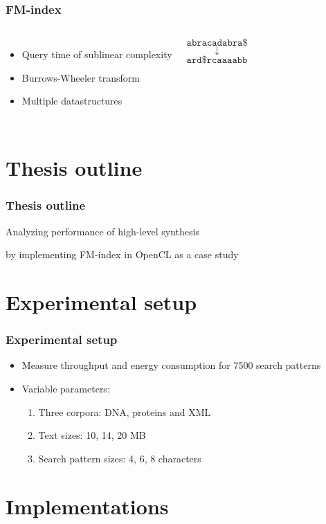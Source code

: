 \documentclass[aspectratio=1610]{uva-inf-presentation}
\begin{document}
\begin{frame}
  \frametitle{FM-index}
  \begin{columns}[c]
    \begin{itemize}
      \item Query time of sublinear complexity
      \item Burrows-Wheeler transform
      \item Multiple datastructures
    \end{itemize}
    \[ \texttt{abracadabra\$} \]
    \[ \downarrow \]
    \[ \texttt{ard\$rcaaaabb} \]
  \end{columns}
\end{frame}

\section{Thesis outline}
\begin{frame}
  \frametitle{Thesis outline}
  Analyzing performance of high-level synthesis \textellipsis

  \textellipsis by implementing FM-index in OpenCL as a case study
\end{frame}

\section{Experimental setup}

\begin{frame}
  \frametitle{Experimental setup}
  \begin{itemize}
    \item Measure throughput and energy consumption for 7500 search patterns
    \item Variable parameters:
      \begin{enumerate}
        \item Three corpora: DNA, proteins and XML
        \item Text sizes: 10, 14, 20 MB
        \item Search pattern sizes: 4, 6, 8 characters
      \end{enumerate}
  \end{itemize}
\end{frame}

\section{Implementations}
\end{document}
